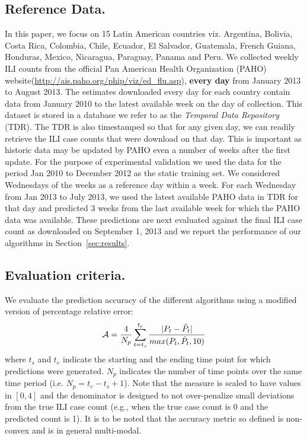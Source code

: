 
\subsection{Reference Data.}
In this paper, we focus on 15 Latin
American countries viz. Argentina, Bolivia, Costa Rica, Colombia, Chile,
Ecuador,  El Salvador, Guatemala, French Guiana, Honduras, Mexico, Nicaragua,
Paraguay, Panama and Peru. We collected weekly ILI counts
from the official Pan American Health Organization (PAHO)
website(\url{http://ais.paho.org/phip/viz/ed_flu.asp}), {\bf every day} from January 2013 to August 2013. The
estimates downloaded every day for each country contain data from January 2010 to the latest
available week on the day of collection. 
This dataset is stored in a database we refer to as
the {\it Temporal Data Repository} (TDR).  The TDR is also timestamped so that for
any given day, we can readily retrieve the ILI case
counts that were download on that day. This is important as historic data may be updated by
PAHO even a number of weeks after the first update.  For the purpose of experimental validation
we used the data for the period Jan 2010 to December 2012 as the static
training set. We considered Wednesdays of the weeks as a reference day within a week.  For
each Wednesday from Jan 2013 to July 2013, we used the latest available PAHO
data in TDR for that day and predicted 3 weeks from the last available week for
which the PAHO data was available. These predictions are next evaluated against
the final ILI case count as downloaded on September 1, 2013 and we report the
performance of our algorithms in Section~\ref{sec:results}. 

\subsection{Evaluation criteria.}
We evaluate the prediction accuracy of the
different algorithms using a modified version of percentage relative error:
\vspace{-1em}
\begin{equation} 
    \label{eq:def:accuracy} 
    \mathcal{A} = \frac{4}{N_p}\sum \limits_{t=t_s}^{t_e}\frac{|P_t -\hat{P}_t| }{max(P_t, \hat{P}_t, 10)}
    \vspace{-1em}
\end{equation} 
where $t_s$ and $t_e$ indicate the starting and the ending
time point for which predictions were generated.  $N_p$ indicates the number of
time points over the same time period (i.e. $N_p = t_e - t_s + 1$). Note that
the measure is scaled to have values in $[0,4]$ and the denominator is
designed to not over-penalize small deviations from the true ILI case count (e.g., when
the true case count is 0 and the predicted count is 1).
It is to be noted that the accuracy metric so defined is
non-convex and is in general multi-modal. 

